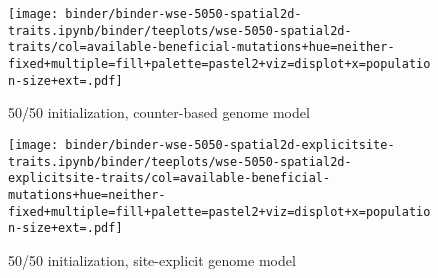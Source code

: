 \begin{sidewaysfigure}[h]
  \rotatesidewayslabel

    \begin{subfigure}[b]{0.47\linewidth}
        \begin{minipage}{\textwidth}
          \texttt{[image: binder/binder-wse-5050-spatial2d-traits.ipynb/binder/teeplots/wse-5050-spatial2d-traits/col=available-beneficial-mutations+hue=neither-fixed+multiple=fill+palette=pastel2+viz=displot+x=population-size+ext=.pdf]}%
        \end{minipage}
        \begin{minipage}{\textwidth}
        \caption{50/50 initialization, counter-based genome model}
        \label{fig:neither-fixed-wse-256atile:5050}
        \end{minipage}%
    \end{subfigure}%

    \begin{subfigure}[b]{0.53\linewidth}
        \begin{minipage}{\textwidth}
          \texttt{[image: binder/binder-wse-5050-spatial2d-explicitsite-traits.ipynb/binder/teeplots/wse-5050-spatial2d-explicitsite-traits/col=available-beneficial-mutations+hue=neither-fixed+multiple=fill+palette=pastel2+viz=displot+x=population-size+ext=.pdf]}%
        \end{minipage}
        \begin{minipage}{\textwidth}
        \caption{50/50 initialization, site-explicit genome model}
        \label{fig:neither-fixed-wse-256atile:5050-explicitsite}
        \end{minipage}%
    \end{subfigure}


\end{sidewaysfigure}
